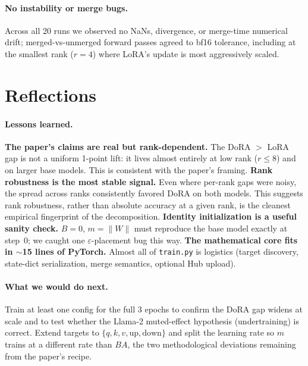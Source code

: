 \documentclass[11pt,twocolumn]{article}
\begin{document}
\paragraph{No instability or merge bugs.}
Across all 20 runs we observed no NaNs, divergence, or merge-time
numerical drift; merged-vs-unmerged forward passes agreed to bf16
tolerance, including at the smallest rank ($r{=}4$) where LoRA's
update is most aggressively scaled.
\vspace{-1em}
\section{Reflections}
\vspace{-1em}
\paragraph{Lessons learned.}\textbf{The paper's claims are real but rank-dependent.} The DoRA
  $>$ LoRA gap is not a uniform 1-point lift: it lives almost entirely
  at low rank ($r{\leq}8$) and on larger base models. This is
  consistent with the paper's framing. \textbf{Rank robustness is the most stable signal.} Even where
  per-rank gaps were noisy, the spread across ranks consistently
  favored DoRA on both models. This suggests rank robustness, rather
  than absolute accuracy at a given rank, is the cleanest empirical
  fingerprint of the decomposition. \textbf{Identity initialization is a useful sanity check.}
  $B{=}0$, $m{=}\|W\|$ must reproduce the base model exactly at step~0;
  we caught one $\varepsilon$-placement bug this way. \textbf{The mathematical core fits in $\sim$15 lines of PyTorch.}
  Almost all of \texttt{train.py} is logistics (target discovery,
  state-dict serialization, merge semantics, optional Hub upload).
\vspace{-1em}
\paragraph{What we would do next.} Train at least one config for the full 3 epochs to confirm the
  DoRA gap widens at scale and to test whether the Llama-2 muted-effect
  hypothesis (undertraining) is correct. Extend targets to $\{q,k,v,\text{up},\text{down}\}$ and split the
  learning rate so $m$ trains at a different rate than $BA$,
  the two methodological deviations remaining from the paper's recipe. 
\vspace{-1em}
\end{document}
